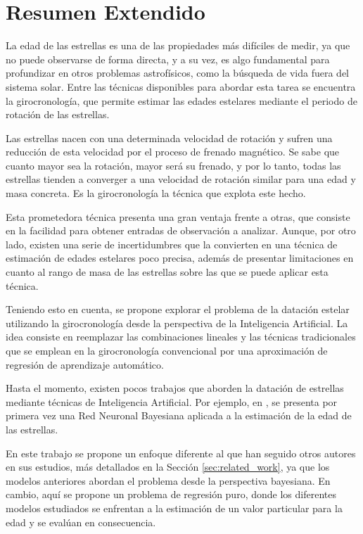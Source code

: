 \chapter{Resumen Extendido}

La edad de las estrellas es una de las propiedades más difíciles de medir, ya que no puede observarse de forma directa, y a su vez, es algo fundamental para profundizar en otros problemas astrofísicos, como la búsqueda de vida fuera del sistema solar. Entre las técnicas disponibles para abordar esta tarea se encuentra la girocronología, que permite estimar las edades estelares mediante el periodo de rotación de las estrellas.

Las estrellas nacen con una determinada velocidad de rotación y sufren una reducción de esta velocidad por el proceso de frenado magnético. Se sabe que cuanto mayor sea la rotación, mayor será su frenado, y por lo tanto, todas las estrellas tienden a converger a una velocidad de rotación similar para una edad y masa concreta. Es la girocronología la técnica que explota este hecho.

Esta prometedora técnica presenta una gran ventaja frente a otras, que consiste en la facilidad para obtener entradas de observación a analizar. Aunque, por otro lado, existen una serie de incertidumbres que la convierten en una técnica de estimación de edades estelares poco precisa, además de presentar limitaciones en cuanto al rango de masa de las estrellas sobre las que se puede aplicar esta técnica.

\vspace{0.5cm}

Teniendo esto en cuenta, se propone explorar el problema de la datación estelar utilizando la girocronología desde la perspectiva de la Inteligencia Artificial. La idea consiste en reemplazar las combinaciones lineales y las técnicas tradicionales que se emplean en la girocronología convencional por una aproximación de regresión de aprendizaje automático.

Hasta el momento, existen pocos trabajos que aborden la datación de estrellas mediante técnicas de Inteligencia Artificial. Por ejemplo, en \cite{sanders2018}, se presenta por primera vez una Red Neuronal Bayesiana aplicada a la estimación de la edad de las estrellas. 

En este trabajo se propone un enfoque diferente al que han seguido otros autores en sus estudios, más detallados en la Sección \ref{sec:related_work}, ya que los modelos anteriores abordan el problema desde la perspectiva bayesiana. En cambio, aquí se propone un problema de regresión puro, donde los diferentes modelos estudiados se enfrentan a la estimación de un valor particular para la edad y se evalúan en consecuencia.

